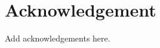 \chapter*{Acknowledgement}
\label{ch:acknowledgement}

\par
\hspace*{0.3cm}Add acknowledgements here.






